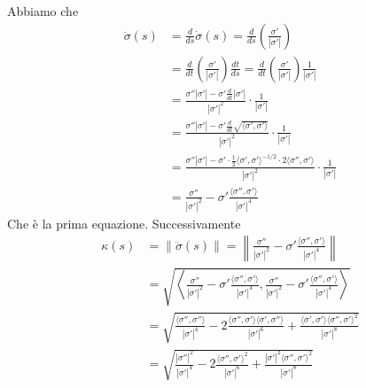 \documentclass[a4paper]{article}
\begin{document}
\begin{snippetproof}{}
    Abbiamo che
    \begin{align*}
        \ddot{\sigma}(s) &= \frac{d}{ds} \dot\sigma(s) = \frac{d}{ds} \left(\frac{\sigma'}{|\sigma'|}\right) \\
        &= \frac{d}{dt} \left(\frac{\sigma'}{|\sigma'|}\right) \frac{dt}{ds}
        = \frac{d}{dt} \left(\frac{\sigma'}{|\sigma'|}\right) \frac{1}{|\sigma'|} \\
        &= \frac{\sigma''|\sigma'| - \sigma' \frac{d}{dt}|\sigma'|}{|\sigma'|^2} \cdot \frac{1}{|\sigma'|} \\
        &= \frac{\sigma''|\sigma'| - \sigma' \frac{d}{dt} \sqrt{\langle \sigma', \sigma' \rangle}}{|\sigma'|^2} \cdot \frac{1}{|\sigma'|} \\
        &= \frac{
            \sigma''|\sigma'| 
            - \sigma' \cdot \frac12 \langle \sigma', \sigma'\rangle^{-1/2} 
            \cdot 2 \langle \sigma'', \sigma'\rangle}{
            |\sigma'|^2
        } \cdot \frac{1}{|\sigma'|} \\
        &= \frac{\sigma''}{|\sigma'|^2} - \sigma' \frac{
            \langle \sigma'', \sigma' \rangle
        }{
            |\sigma'|^4
        }
    \end{align*}
    Che è la prima equazione. Successivamente
    \begin{align*}
        \kappa(s) &= \|\ddot\sigma(s)\| = \left\|
            \frac{\sigma''}{|\sigma'|^2} - \sigma' \frac{
                \langle \sigma'', \sigma'\rangle
            }{|\sigma'|^4}
        \right\| \\
        &= \sqrt{
            \left\langle 
                \frac{\sigma''}{|\sigma'|^2} - \sigma' \frac{\langle \sigma'', \sigma'\rangle}{|\sigma'|^4}, 
                \frac{\sigma''}{|\sigma'|^2} - \sigma' \frac{\langle \sigma'', \sigma'\rangle}{|\sigma'|^4} 
            \right\rangle
        } \\
        &= \sqrt{
            \frac{\langle \sigma'', \sigma''\rangle}{|\sigma'|^4} 
            - 2 \frac{\langle \sigma'', \sigma'\rangle \langle \sigma', \sigma''\rangle}{|\sigma'|^6} 
            + \frac{\langle \sigma', \sigma'\rangle\langle \sigma'', \sigma'\rangle^2}{|\sigma'|^8}
        } \\
        &= \sqrt{
            \frac{|\sigma''|^2}{|\sigma'|^4} 
            - 2 \frac{\langle \sigma'', \sigma'\rangle^2}{|\sigma'|^6} 
            + \frac{|\sigma'|^2 \langle \sigma'', \sigma'\rangle^2}{|\sigma'|^8}
        } \\

\end{align*}
\end{snippetproof}
\end{document}
